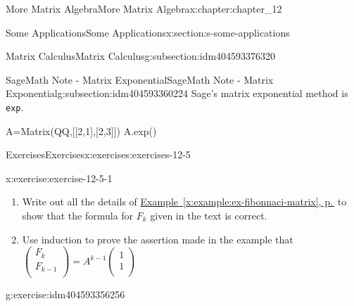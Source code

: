 \documentclass[twoside,10pt,]{book}
\newcommand{\xreffont}{\relax}
\newcommand{\mono}[1]{\texttt{#1}}
\numberwithin{equation}{section}
\begin{document}
\begin{chapterptx}{More Matrix Algebra}{}{More Matrix Algebra}{}{}{x:chapter:chapter_12}
\begin{sectionptx}{Some Applications}{}{Some Applications}{}{}{x:section:s-some-applications}
\begin{subsectionptx}{Matrix Calculus}{}{Matrix Calculus}{}{}{g:subsection:idm404593376320}
\end{subsectionptx}
%
%
\typeout{************************************************}
\typeout{************************************************}
%
\begin{subsectionptx}{SageMath Note - Matrix Exponential}{}{SageMath Note - Matrix Exponential}{}{}{g:subsection:idm404593360224}
%
Sage's matrix exponential method is \mono{exp}.%
\begin{sageinput}
A=Matrix(QQ,[[2,1],[2,3]])
A.exp()
\end{sageinput}
\begin{sageoutput}
[1/3*e^4 + 2/3*e 1/3*e^4 - 1/3*e]
[2/3*e^4 - 2/3*e 2/3*e^4 + 1/3*e]
\end{sageoutput}
\end{subsectionptx}
%
%
\typeout{************************************************}
\typeout{************************************************}
%
\begin{exercises-subsection}{Exercises}{}{Exercises}{}{}{x:exercises:exercises-12-5}
\begin{divisionexercise}{1}{}{}{x:exercise:exercise-12-5-1}%
%
\begin{enumerate}[label=(\alph*)]
\item{}Write out all the details of \hyperref[x:example:ex-fibonnaci-matrix]{Example~{\xreffont\ref{x:example:ex-fibonnaci-matrix}}, p.\,\pageref{x:example:ex-fibonnaci-matrix}} to show that the formula for \(F_k\) given in the text is correct.%
\item{}Use induction to prove the assertion made in the example that \(\left(
\begin{array}{c}
F_k \\
F_{k-1} \\
\end{array}
\right)=A^{k-1} \left(
\begin{array}{c}
1 \\
1 \\
\end{array}
\right)\)%
\end{enumerate}
%
\end{divisionexercise}%
\begin{divisionexercise}{2}{}{}{g:exercise:idm404593356256}%
%
\begin{enumerate}[label=(\alph*)]

\end{enumerate}
\end{divisionexercise}
\end{exercises-subsection}
\end{sectionptx}
\end{chapterptx}
\end{document}
